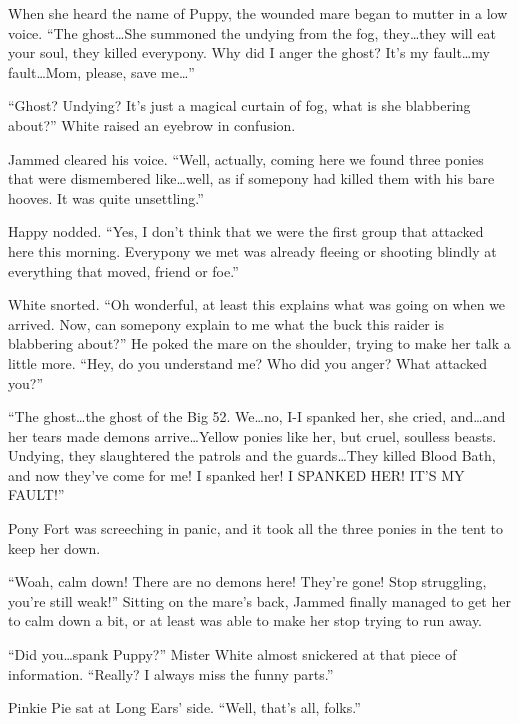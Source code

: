 When she heard the name of Puppy, the wounded mare began to mutter in a low voice. ``The ghost\dots She summoned the undying from the fog, they\dots they will eat your soul, they killed everypony. Why did I anger the ghost? It's my fault\dots my fault\dots Mom, please, save me\dots''

``Ghost? Undying? It's just a magical curtain of fog, what is she blabbering about?'' White raised an eyebrow in confusion.

Jammed cleared his voice. ``Well, actually, coming here we found three ponies that were dismembered like\dots well, as if somepony had killed them with his bare hooves. It was quite unsettling.''

Happy nodded. ``Yes, I don't think that we were the first group that attacked here this morning. Everypony we met was already fleeing or shooting blindly at everything that moved, friend or foe.''

White snorted. ``Oh wonderful, at least this explains what was going on when we arrived. Now, can somepony explain to me what the buck this raider is blabbering about?'' He poked the mare on the shoulder, trying to make her talk a little more. ``Hey, do you understand me? Who did you anger? What attacked you?''

``The ghost\dots the ghost of the Big 52. We\dots no, I-I spanked her, she cried, and\dots and her tears made demons arrive\dots Yellow ponies like her, but cruel, soulless beasts. Undying, they slaughtered the patrols and the guards\dots They killed Blood Bath, and now they've come for me! I spanked her! I SPANKED HER! IT'S MY FAULT!''

Pony Fort was screeching in panic, and it took all the three ponies in the tent to keep her down.

``Woah, calm down! There are no demons here! They're gone! Stop struggling, you're still weak!'' Sitting on the mare's back, Jammed finally managed to get her to calm down a bit, or at least was able to make her stop trying to run away.

``Did you\dots spank Puppy?'' Mister White almost snickered at that piece of information. ``Really? I always miss the funny parts.''



\horizonline


Pinkie Pie sat at Long Ears' side. ``Well, that's all, folks.''


